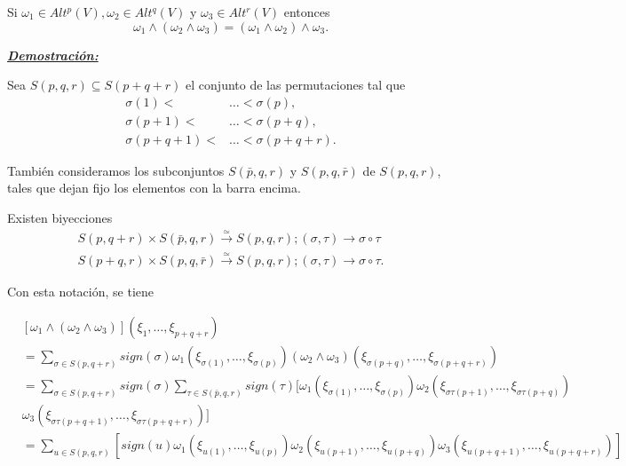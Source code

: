 \begin{Lem}
Si $\omega_1\in Alt^p(V), \omega_2\in Alt^q(V)$ y $\omega_3\in Alt^r(V)$ entonces
$$ \omega_1\wedge(\omega_2 \wedge \omega_3)=(\omega_1\wedge \omega_2)\wedge \omega_3.$$
\end{Lem}

\underline{{\textbf{\textit{Demostración:}}}}

Sea $S(p,q,r)\subseteq S(p+q+r)$ el conjunto de las permutaciones tal que
\begin{equation}
  \begin{split}
    \sigma(1)<&\dots<\sigma(p), \\
    \sigma(p+1)<&\dots<\sigma(p+q),\\
    \sigma(p+q+1)<&\dots<\sigma(p+q+r).
  \end{split}
\end{equation}

También consideramos los subconjuntos $S(\bar{p},q,r)$ y $S(p,q,\bar{r})$ de $S(p,q,r)$, tales que dejan fijo los elementos con la barra encima. 

Existen biyecciones
\begin{equation}
  \begin{split}
    S(p,q+r)\times S(\bar{p},q,r)\xrightarrow{\simeq} S(p,q,r);(\sigma,\tau)\rightarrow \sigma\circ \tau \\
    S(p+q,r)\times S(p,q,\bar{r})\xrightarrow{\simeq} S(p,q,r);(\sigma,\tau)\rightarrow \sigma\circ \tau.
  \end{split}
\end{equation}

Con esta notación, se tiene

\begin{equation}
  \begin{split}
   & [\omega_1\wedge(\omega_2\wedge\omega_3)](\xi_1,\dots,\xi_{p+q+r}) \\
   &= \sum_{\sigma\in S(p,q+r)}sign(\sigma)\omega_1(\xi_{\sigma(1)},\dots,\xi_{\sigma(p)})(\omega_2\wedge\omega_3)(\xi_{\sigma(p+q)},\dots,\xi_{\sigma(p+q+r)}) \\
   &= \sum_{\sigma\in S(p,q+r)}sign(\sigma) \sum_{\tau\in S(\bar{p},q,r)}sign(\tau) [\omega_1(\xi_{\sigma(1)},\dots,\xi_{\sigma(p)})\omega_2(\xi_{\sigma\tau(p+1)},\dots,\xi_{\sigma\tau(p+q)}) \\
    &  \omega_3(\xi_{\sigma\tau(p+q+1)},\dots,\xi_{\sigma\tau(p+q+r)})] \\
   &=\sum_{u\in S(p,q,r)}[sign(u)\omega_1(\xi_{u(1)},\dots,\xi_{u(p)})\omega_2(\xi_{u(p+1)},\dots,\xi_{u(p+q)})\omega_3(\xi_{u(p+q+1)},\dots,\xi_{u(p+q+r)})]
  \end{split}
\end{equation}

